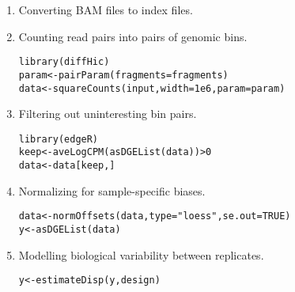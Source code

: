 \documentclass{report}\usepackage[]{graphicx}\usepackage[usenames,dvipsnames]{color}
\newcommand{\hlnum}[1]{\textcolor[rgb]{0.816,0.125,0.439}{#1}}%
\newcommand{\hlstr}[1]{\textcolor[rgb]{0.251,0.627,0.251}{#1}}%
\newcommand{\hlopt}[1]{\textcolor[rgb]{0,0,0}{#1}}%
\newcommand{\hlstd}[1]{\textcolor[rgb]{0.251,0.251,0.251}{#1}}%
\newcommand{\hlkwb}[1]{\textcolor[rgb]{0,0,0}{#1}}%
\newcommand{\hlkwc}[1]{\textcolor[rgb]{0.251,0.251,0.251}{#1}}%
\newcommand{\hlkwd}[1]{\textcolor[rgb]{0.878,0.439,0.125}{#1}}%
\newenvironment{knitrout}{}{} %
\begin{document}
\begin{enumerate}
\item Converting BAM files to index files.
\item Counting read pairs into pairs of genomic bins.
\begin{knitrout}
\color{fgcolor}\begin{kframe}
\begin{alltt}
\hlkwd{library}\hlstd{(diffHic)}
\hlstd{param} \hlkwb{<-} \hlkwd{pairParam}\hlstd{(}\hlkwc{fragments}\hlstd{=fragments)}
\hlstd{data} \hlkwb{<-} \hlkwd{squareCounts}\hlstd{(input,} \hlkwc{width}\hlstd{=}\hlnum{1e6}\hlstd{,} \hlkwc{param}\hlstd{=param)}
\end{alltt}
\end{kframe}
\end{knitrout}
\item Filtering out uninteresting bin pairs.
\begin{knitrout}
\color{fgcolor}\begin{kframe}
\begin{alltt}
\hlkwd{library}\hlstd{(edgeR)}
\hlstd{keep} \hlkwb{<-} \hlkwd{aveLogCPM}\hlstd{(}\hlkwd{asDGEList}\hlstd{(data))} \hlopt{>} \hlnum{0}
\hlstd{data} \hlkwb{<-} \hlstd{data[keep,]}
\end{alltt}
\end{kframe}
\end{knitrout}
\item Normalizing for sample-specific biases.
\begin{knitrout}
\color{fgcolor}\begin{kframe}
\begin{alltt}
\hlstd{data} \hlkwb{<-} \hlkwd{normOffsets}\hlstd{(data,} \hlkwc{type}\hlstd{=}\hlstr{"loess"}\hlstd{,} \hlkwc{se.out}\hlstd{=}\hlnum{TRUE}\hlstd{)}
\hlstd{y} \hlkwb{<-} \hlkwd{asDGEList}\hlstd{(data)}
\end{alltt}
\end{kframe}
\end{knitrout}
\item Modelling biological variability between replicates.
\begin{knitrout}
\color{fgcolor}\begin{kframe}
\begin{alltt}
\hlstd{y} \hlkwb{<-} \hlkwd{estimateDisp}\hlstd{(y, design)}

\end{alltt}
\end{kframe}
\end{knitrout}
\end{enumerate}
\end{document}
